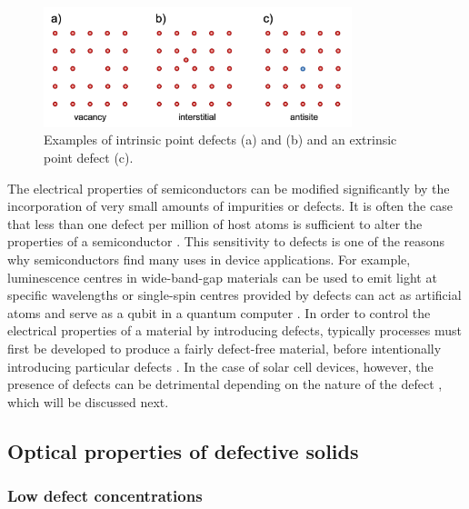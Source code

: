 \documentclass[11pt, twoside]{report}
\begin{document}
\begin{figure}[h!]
  \centering
    \includegraphics[width=0.8\textwidth]{figures/new_defects.png}
    \caption[Examples of intrinsic point defects (a) and (b) and an extrinsic point defect (c).]{Examples of intrinsic point defects (a) and (b) and an extrinsic point defect (c).}
  \label{defects}
\end{figure}

The electrical properties of semiconductors can be modified significantly by the incorporation of very small amounts of impurities or defects. It is often the case that less than one defect per million of host atoms is sufficient to alter the properties of a semiconductor \cite{fund_semi}. This sensitivity to defects is one of the reasons why semiconductors find many uses in device applications. For example, luminescence centres in wide-band-gap materials can be used to emit light at specific wavelengths or single-spin centres provided by defects can act as artificial atoms and serve as a qubit in a quantum computer \cite{defects_tutorial}. In order to control the electrical properties of a material by introducing defects, typically processes must first be developed to produce a fairly defect-free material, before intentionally introducing particular defects \cite{fund_semi}. In the case of solar cell devices, however, the presence of defects can be detrimental depending on the nature of the defect \cite{Aron_defect_tolerance}, which will be discussed next. 

\subsection{Optical properties of defective solids}\label{defect_theory}
\subsubsection{Low defect concentrations}
\end{document}
